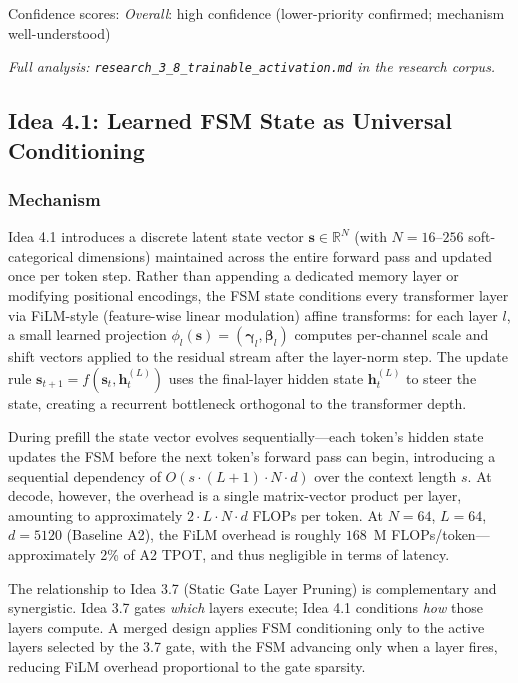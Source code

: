 \documentclass[11pt]{article}
\begin{document}
\noindent
Confidence scores:
\emph{Overall}: high confidence (lower-priority confirmed; mechanism well-understood)

\par\noindent\textit{Full analysis: \texttt{research\_3\_8\_trainable\_activation.md} in the research corpus.}

\subsection{Idea 4.1: Learned FSM State as Universal Conditioning}
\label{subsec:idea41}

\subsubsection*{Mechanism}

Idea 4.1 introduces a discrete latent state vector $\mathbf{s} \in \mathbb{R}^{N}$ (with $N = 16$--$256$ soft-categorical dimensions) maintained across the entire forward pass and updated once per token step. Rather than appending a dedicated memory layer or modifying positional encodings, the FSM state conditions every transformer layer via FiLM-style (feature-wise linear modulation) affine transforms: for each layer $l$, a small learned projection $\phi_l(\mathbf{s}) = (\boldsymbol{\gamma}_l, \boldsymbol{\beta}_l)$ computes per-channel scale and shift vectors applied to the residual stream after the layer-norm step. The update rule $\mathbf{s}_{t+1} = f(\mathbf{s}_t, \mathbf{h}_t^{(L)})$ uses the final-layer hidden state $\mathbf{h}_t^{(L)}$ to steer the state, creating a recurrent bottleneck orthogonal to the transformer depth.

During prefill the state vector evolves sequentially---each token's hidden state updates the FSM before the next token's forward pass can begin, introducing a sequential dependency of $O(s \cdot (L+1) \cdot N \cdot d)$ over the context length $s$. At decode, however, the overhead is a single matrix-vector product per layer, amounting to approximately $2 \cdot L \cdot N \cdot d$ FLOPs per token. At $N{=}64$, $L{=}64$, $d{=}5120$ (Baseline A2), the FiLM overhead is roughly $168$~M FLOPs/token---approximately 2\% of A2 TPOT, and thus negligible in terms of latency.

The relationship to Idea 3.7 (Static Gate Layer Pruning) is complementary and synergistic. Idea 3.7 gates \emph{which} layers execute; Idea 4.1 conditions \emph{how} those layers compute. A merged design applies FSM conditioning only to the active layers selected by the 3.7 gate, with the FSM advancing only when a layer fires, reducing FiLM overhead proportional to the gate sparsity.
\end{document}
